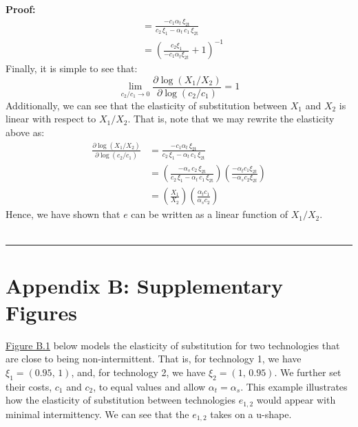\documentclass[11pt,a4paper,leqno]{extarticle}
\newenvironment{proof}[1][Proof]{\noindent\textbf{#1:} }{\ \rule{0.5em}{0.5em}}
\begin{document}
\begin{proof}
\begin{align*}
		&= \frac{-c_1 \alpha _{t}\,\xi _{\mathrm{2t}}}{c_2\,\xi_1-\alpha _{t}\,c_{1}\,\xi _{\mathrm{2t}}}\\
		&= \left( \frac{c_2 \xi_1 }{-c_1 \alpha_t \xi_{2t}} + 1 \right)^{-1}
		\end{align*}
		Finally, it is simple to see that:
		$$ \lim_{c_2/c_1 \to 0} \frac{\partial \log(X_1/X_2)}{\partial \log(c_2/c_1)} = 1$$
		Additionally, we can see that the elasticity of substitution between $X_1$ and $X_2$ is linear with respect to $X_1/X_2$. That is, note that we may rewrite the elasticity above as:
		\begin{align*}
		\frac{\partial \log(X_1/X_2)}{\partial \log(c_2/c_1)} &= \frac{-c_1 \alpha _{t}\,\xi _{\mathrm{2t}}}{c_2\,\xi_1-\alpha _{t}\,c_{1}\,\xi _{\mathrm{2t}}} \\
		&= \left( \frac{-\alpha _{s}\,c_{2}\,\xi _{\mathrm{2t}}}{c_2\,\xi_1-\alpha _{t}\,c_{1}\,\xi _{\mathrm{2t}}} \right) \left( \frac{- \alpha_t c_1 \xi_{2t} }{- \alpha_s c_2 \xi_{2t}} \right)\\
		&= \left( \frac{X_1}{X_2} \right) \left( \frac{ \alpha_t c_1  }{\alpha_s c_2 } \right)
		\end{align*}
		Hence, we have shown that $e$ can be written as a linear function of $X_1/X_2$. 
		\\ \hfill
	\end{proof}
	
	
	\pagebreak
	
	
	
	
	
	\section{Appendix B: Supplementary Figures}
	\label{sec:AppendixB}
	
	
	\hyperref[fig:eosrange]{Figure B.1} below models the elasticity of substitution for two technologies that are close to being non-intermittent. That is, for technology 1, we have $\xi_1 = (0.95,\, 1)$, and, for technology 2, we have $\xi_2 = (1, \,0.95)$. We further set their costs, $c_1$ and $c_2$, to equal values and allow $\alpha_t = \alpha_s$. This example illustrates how the elasticity of substitution between technologies $e_{1,2}$ would appear with minimal intermittency. We can see that the $e_{1,2}$ takes on a u-shape. 
	
\end{document}
